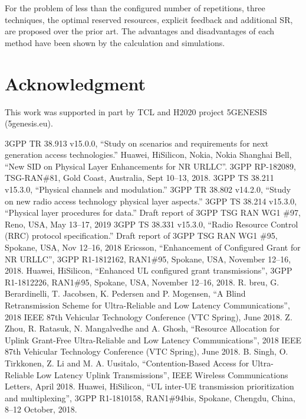\documentclass{ieeeaccess}
\begin{document}
For the problem of less than the configured number of repetitions, three techniques, the optimal reserved resources, explicit feedback and additional SR, are proposed over the prior art. The advantages and disadvantages of each method have been shown by the calculation and simulations. 

\section*{Acknowledgment}

This work was supported in part by TCL and H2020 project 5GENESIS (5genesis.eu).

\begin{thebibliography}{00}

 3GPP TR 38.913 v15.0.0, ``Study on scenarios and requirements for next generation access technologies.''
 Huawei, HiSilicon, Nokia, Nokia Shanghai Bell, ``New SID on Physical Layer Enhancements for NR URLLC''. 3GPP RP-182089, TSG-RAN\#81, Gold Coast, Australia, Sept 10--13, 2018.
 3GPP TS 38.211 v15.3.0, ``Physical channels and modulation.''
 3GPP TR 38.802 v14.2.0, ``Study on new radio access technology physical layer aspects.''
 3GPP TS 38.214 v15.3.0, ``Physical layer procedures for data.''
 Draft report of 3GPP TSG RAN WG1 \#97, Reno, USA, May 13--17, 2019
 3GPP TS 38.331 v15.3.0, ``Radio Resource Control (RRC) protocol specification.''
 Draft report of 3GPP TSG RAN WG1 \#95, Spokane, USA, Nov 12--16, 2018
 Ericsson, ``Enhancement of Configured Grant for NR URLLC'', 3GPP R1-1812162, RAN1\#95, Spokane, USA, November 12--16, 2018.
 Huawei, HiSilicon, ``Enhanced UL configured grant transmissions'', 3GPP R1-1812226, RAN1\#95, Spokane, USA, November 12--16, 2018.
 R. breu, G. Berardinelli, T. Jacobsen, K. Pedersen and P. Mogensen, ``A Blind Retransmission Scheme for Ultra-Reliable and Low Latency Communications'', 2018 IEEE 87th Vehicular Technology Conference (VTC Spring), June 2018.
 Z. Zhou, R. Ratasuk, N. Mangalvedhe and A. Ghosh, ``Resource Allocation for Uplink Grant-Free Ultra-Reliable and Low Latency Communications'', 2018 IEEE 87th Vehicular Technology Conference (VTC Spring), June 2018.
 B. Singh, O. Tirkkonen, Z. Li and M. A. Uusitalo, ``Contention-Based Access for Ultra-Reliable Low Latency Uplink Transmissions'',  IEEE Wireless Communications Letters, April 2018.
 Huawei, HiSilicon, ``UL inter-UE transmission prioritization and multiplexing'', 3GPP R1-1810158, RAN1\#94bis, Spokane, Chengdu, China, 8--12 October, 2018.

\end{thebibliography}
\end{document}
